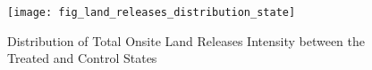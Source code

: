 \begin{figure}[H]
    \centering
    \texttt{[image: fig\_land\_releases\_distribution\_state]}
    \caption{Distribution of Total Onsite Land Releases Intensity between the Treated and Control States}
    \label{fig:land-releases-distribution}
\end{figure}